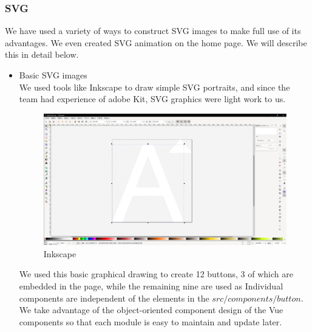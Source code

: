 \documentclass[11pt]{article}
\begin{document}
\begin{spacing}{1.0}
	\subsubsection{SVG}
	We have used a variety of ways to construct SVG images to make full use of its advantages. We even created SVG  animation on the home page. We will describe this in detail below.
	\begin{itemize}
		\item Basic SVG images\\
		We used tools like Inkscape to draw simple SVG portraits, and since the team had experience of  adobe Kit, SVG graphics were light work to us. 
		\begin{figure}[H]
			\centering
			\includegraphics[scale=.3]{figures/svg1.png}
			\caption{Inkscape}
			\label{fig:1}
		\end{figure}
	We used this basic graphical drawing to create 12 buttons, 3 of which are embedded in the page, while the remaining nine are used as Individual components are independent of the elements in the $src/components/button$. We take advantage of the object-oriented component design of the Vue components so that each module is easy to maintain and update later.
	\begin{figure}[H]
		\centering

\end{figure}
\end{itemize}
\end{spacing}
\end{document}
